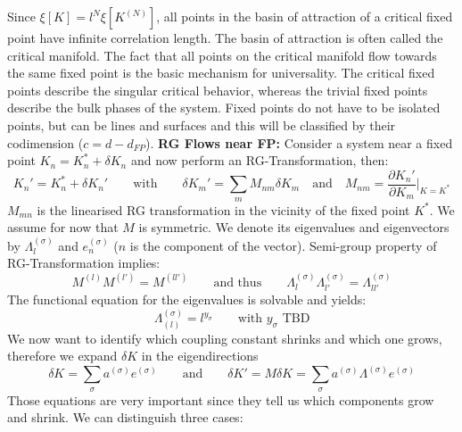 	Since $\xi[K] =	l^N \xi[K^{(N)}]$, all points in the basin of attraction of a critical fixed point have infinite correlation length. The basin of attraction is often called the critical manifold. The fact that all points on the critical manifold flow towards the same fixed point is the basic mechanism for universality. The critical fixed points describe the singular critical behavior, whereas the trivial fixed points describe the bulk phases of the system. Fixed points do not have to be isolated points, but can be lines and surfaces and this will be classified by their codimension ($c = d - d_{FP}$).
	\textbf{RG Flows near FP:} Consider a system near a fixed point $K_n =	K_n^* + \delta K_n$ and now perform an RG-Transformation, then:
	\begin{equation}
		K_n' = K_n^* + \delta K_n' \qquad \text{with} \qquad \delta K_m' =	\sum_m M_{nm} \delta K_m \quad \text{and} \quad M_{nm} =	\frac{\partial K_n'}{\partial K_m}\bigg|_{K=K^*}
	\end{equation}
	$M_{mn}$ is the linearised RG transformation in the vicinity of the fixed point $K^*$. We assume for now that $M$ is symmetric. We denote its eigenvalues and eigenvectors by $\Lambda_l^{(\sigma)}$ and $e_n^{(\sigma)}$ ($n$ is the component of the vector). Semi-group property of RG-Transformation implies:
	\begin{equation}
		M^{(l)}M^{(l')} =	M^{(ll')} \qquad \text{and thus} \qquad \Lambda_l^{(\sigma)}\Lambda_{l'}^{(\sigma)} =	\Lambda_{ll'}^{(\sigma)}
	\end{equation}
	The functional equation for the eigenvalues is solvable and yields:
	\begin{equation}
		\Lambda_{(l)}^{(\sigma)} =	l^{y_\sigma} \qquad \text{with $y_\sigma$ TBD}
	\end{equation}
	We now want to identify which coupling constant shrinks and which one grows, therefore we expand $\delta K$ in the eigendirections
	\begin{equation}
		\delta K =	\sum_\sigma 	a^{(\sigma)} e^{(\sigma)} \qquad \text{and} \qquad \delta K' =	M \delta K =	\sum_\sigma a^{(\sigma)} \Lambda^{(\sigma)} e^{(\sigma)}
	\end{equation}
	Those equations are very important since they tell us which components grow and shrink. We can distinguish three cases:
	
